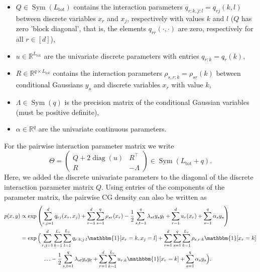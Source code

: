 \documentclass{article}
\def\tot{\text{tot}}
\newcommand{\indFunc}[1]{\mathbbm{1}[ #1 ]}
\newcommand{\IR}{{\mathbb{R}}}\newcommand{\IN}{{\mathbb{N}}}
\newcommand{\bPr}[1]{\ensuremath{\left(#1 \right)}} %
\DeclareMathOperator{\diag}{diag}
\DeclareMathOperator{\Sym}{Sym}
\begin{document}
\begin{itemize}
	\item $Q\in \Sym(L_{\tot})$ contains
	the interaction parameters $q_{r:k,j:l} = q_{rj}(k,l)$ between discrete variables  $x_r$ and $x_j$, respectively with values $k$ and $l$
	($Q$ has zero 'block diagonal', that is, the elements $q_{rr}(\cdot, \cdot)$ are zero, respectively for all $r\in[d]$),
	\item $u\in \IR^{L_{\tot}}$ are the univariate discrete parameters with entries $q_{r:k}=q_r(k)$,
	
	\item $R\in \IR^{q\times L_{\tot}}$ 
	contains the interaction parameters $\rho_{s, r:k}=\rho_{sr}(k)$ between conditional Gaussians $y_s$ and discrete variables $x_r$ with value $k$,
	\item $\Lambda \in \Sym(q)$ is the precision matrix of the conditional Gaussian variables (must be positive definite),
	\item $\alpha\in\IR^{q}$ are the univariate continuous parameters.
\end{itemize}
For the pairwise interaction parameter matrix we write
\[\Theta = \begin{pmatrix} Q + 2\diag(u) & R^\top \\ R & -\Lambda\end{pmatrix} \in \Sym(L_{\tot}+q).\]
Here, we added the discrete univariate parameters to the diagonal of the discrete interaction parameter matrix $Q$.
Using entries of the components of the parameter matrix, the pairwise CG density can also be written as
\begin{align*}
p(x, y) &\propto \exp\bPr{\sum_{r, j=1}^{d} q_{rj}(x_r, x_j) + \sum_{r=1}^{d} \sum_{s=1}^{q} \rho_{sr}(x_r) - \frac{1}{2}\sum_{s, t=1}^{q}\lambda_{st}y_s y_t+ \sum_{r=1}^{d} u_r(x_r) + \sum_{s=1}^{q}\alpha_s y_s } \\
&= \exp\Big(\sum_{r, j=1}^{d} \sum_{k=1}^{L_r}\sum_{l=1}^{L_j} q_{r:k, j:l}\indFunc{x_r=k, x_j=l} + \sum_{r=1}^{d} \sum_{s=1}^{q}\sum_{k=1}^{L_r} \rho_{s,r:k}\indFunc{x_r=k} \\
&\qquad\qquad	\ldots - \frac{1}{2}\sum_{s, t=1}^{q}\lambda_{st}y_s y_t+ \sum_{r=1}^{d} \sum_{k=1}^{L_r} u_{r:k}\indFunc{x_r=k} + \sum_{s=1}^{q}\alpha_s y_s \Big).
 \end{align*}
\end{document}
